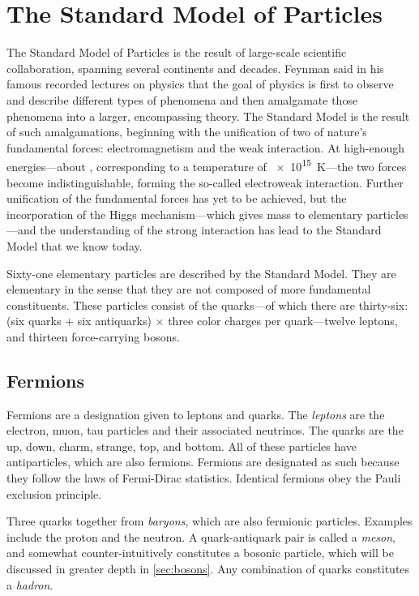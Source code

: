 	\section{The Standard Model of Particles}

	The Standard Model of Particles is the result of large-scale scientific collaboration, spanning several continents and decades. Feynman said in his famous recorded lectures on physics that the goal of physics is first to observe and describe different types of phenomena and then amalgamate those phenomena into a larger, encompassing theory. The Standard Model is the result of such amalgamations, beginning with the unification of two of nature's fundamental forces: electromagnetism and the weak interaction. At high-enough energies---about , corresponding to a temperature of \SI{e15}{\kelvin}---the two forces become indistinguishable, forming the so-called electroweak interaction. Further unification of the fundamental forces has yet to be achieved, but the incorporation of the Higgs mechanism---which gives mass to elementary particles---and the understanding of the strong interaction has lead to the Standard Model that we know today.

	Sixty-one elementary particles are described by the Standard Model. They are elementary in the sense that they are not composed of more fundamental constituents. These particles consist of the quarks---of which there are thirty-six: (six quarks + six antiquarks) $\times$ three color charges per quark---twelve leptons, and thirteen force-carrying bosons.

	\subsection{Fermions}
	\label{sec:fermions}

	Fermions are a designation given to leptons and quarks. The \emph{leptons} are the electron, muon, tau particles and their associated neutrinos. The quarks are the up, down, charm, strange, top, and bottom. All of these particles have antiparticles, which are also fermions. Fermions are designated as such because they follow the laws of Fermi-Dirac statistics. Identical fermions obey the Pauli exclusion principle. 

	Three quarks together from \emph{baryons}, which are also fermionic particles. Examples include the proton and the neutron. A quark-antiquark pair is called a \emph{meson}, and somewhat counter-intuitively constitutes a bosonic particle, which will be discussed in greater depth in \SEC \ref{sec:bosons}. Any combination of quarks constitutes a \emph{hadron}.

